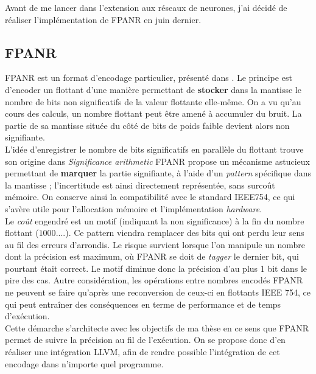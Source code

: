 \documentclass[a4paper,11pt]{article}
\begin{document}
Avant de me lancer dans l’extension aux réseaux de neurones, j’ai décidé de réaliser l’implémentation de FPANR en juin dernier.

\subsection{ FPANR }
FPANR est un format d'encodage particulier, présenté dans \cite{defour2018fp}.
Le principe est d'encoder un flottant d'une manière permettant de \textbf{stocker} dans la mantisse le nombre de bits non significatifs de la valeur flottante elle-même.
On a vu qu’au cours des calculs, un nombre flottant peut être amené à accumuler du bruit. La partie de sa mantisse située du côté de bits de poids faible devient alors non signifiante.\\
L'idée d'enregistrer le nombre de bits significatifs en parallèle du flottant trouve son origine dans \textit{Significance arithmetic}\cite{goldstein1963significance}
FPANR propose un mécanisme astucieux permettant de \textbf{marquer} la partie signifiante, à l'aide d'un \textit{pattern} spécifique dans la mantisse ; l'incertitude est ainsi directement représentée, sans surcoût mémoire.
On conserve ainsi la compatibilité avec le standard IEEE754, ce qui s'avère utile pour l’allocation mémoire et l’implémentation \textit{hardware}.
\\
Le \textit{coût} engendré est un motif (indiquant la non significance) à la fin du nombre flottant ($1000....$). Ce pattern viendra remplacer des bits qui ont perdu leur sens au fil des erreurs d'arrondis. Le risque survient lorsque l'on manipule un nombre dont la précision est maximum, où FPANR se doit de \textit{tagger} le dernier bit, qui pourtant était correct. Le motif diminue donc la précision d'au plus 1 bit dans le pire des cas. %
Autre considération, les opérations entre nombres encodés FPANR ne peuvent se faire qu’après une reconversion de ceux-ci en flottants IEEE 754, ce qui peut entraîner des conséquences en terme de performance et de temps d’exécution.
\\

Cette démarche s’architecte avec les objectifs de ma thèse en ce sens que FPANR permet de suivre la précision au fil de l’exécution.
On se propose donc d'en réaliser une intégration LLVM, afin de rendre possible l’intégration de cet encodage dans n’importe quel programme.
\end{document}
